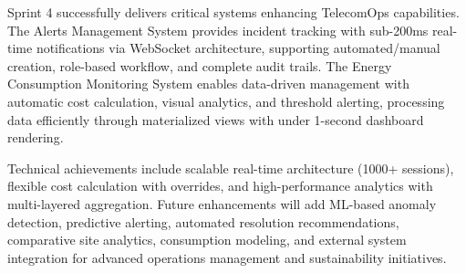 Sprint 4 successfully delivers critical systems enhancing TelecomOps capabilities. The Alerts Management System provides incident tracking with sub-200ms real-time notifications via WebSocket architecture, supporting automated/manual creation, role-based workflow, and complete audit trails. The Energy Consumption Monitoring System enables data-driven management with automatic cost calculation, visual analytics, and threshold alerting, processing data efficiently through materialized views with under 1-second dashboard rendering.

Technical achievements include scalable real-time architecture (1000+ sessions), flexible cost calculation with overrides, and high-performance analytics with multi-layered aggregation. Future enhancements will add ML-based anomaly detection, predictive alerting, automated resolution recommendations, comparative site analytics, consumption modeling, and external system integration for advanced operations management and sustainability initiatives.